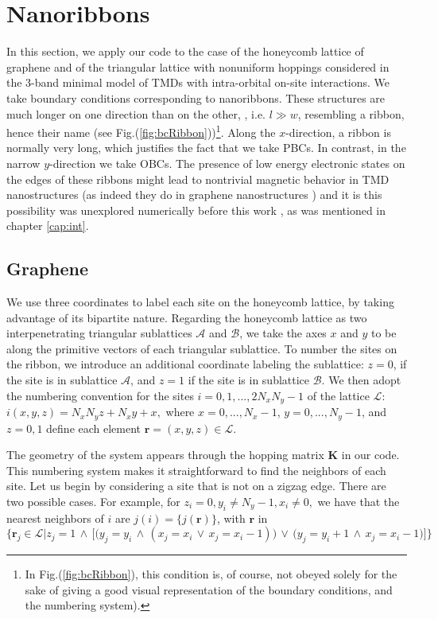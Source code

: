 \section{Nanoribbons}
\label{sec:nanoribbon}

In this section, we apply our code to the case of the honeycomb lattice of graphene and of the triangular lattice with nonuniform hoppings considered in the 3-band minimal model of \acs{TMD}s with intra-orbital on-site interactions.
We take boundary conditions corresponding to nanoribbons.
These structures are much longer on one direction than on the other, , i.e. $l \gg w$, resembling a ribbon, hence their name (see Fig.(\ref{fig:bcRibbon}))\footnote{In Fig.(\ref{fig:bcRibbon}), this condition is, of course, not obeyed solely for the sake of giving a good visual representation of the boundary conditions, and the numbering system).}.
Along the $x$-direction, a ribbon is normally very long, which justifies the fact that we take \acp{PBC}.
In contrast, in the narrow $y$-direction we take \acp{OBC}.
The presence of low energy electronic states on the edges of these ribbons might lead to nontrivial magnetic behavior in \ac{TMD} nanostructures (as indeed they do in graphene nanostructures \cite{yazyev_emergence_2010}) and it is this possibility was unexplored numerically before this work \cite{feldner_dynamical_2011, golor_quantum_2013}, as was mentioned in chapter \ref{cap:int}.

\subsection{Graphene}
\label{sec:graphene}

We use three coordinates to label each site on the honeycomb lattice, by taking advantage of its bipartite nature.
Regarding the honeycomb lattice as two interpenetrating triangular sublattices $\mathcal{A}$ and $\mathcal{B}$, we take the axes $x$ and $y$ to be along the primitive vectors of each triangular sublattice.
To number the sites on the ribbon, we introduce an additional coordinate labeling the sublattice: $z = 0$, if the site is in sublattice $\mathcal{A}$, and $z = 1$ if the site is in sublattice $\mathcal{B}$.
We then adopt the numbering convention for the sites $i = 0,1, ..., 2 N_x N_y - 1$ of the lattice $\mathcal{L}$:
$
i (x, y, z) = N_x N_y z + N_x y + x,
$
 where $x = 0, ..., N_x - 1$, $y = 0, ..., N_y - 1$, and $z = 0, 1$ define each element $\bm r = (x, y, z) \in \mathcal{L}$.

The geometry of the system appears through the hopping matrix $\bm K$ in our code.
This numbering system makes it straightforward to find the neighbors of each site.
Let us begin by considering a site that is not on a zigzag edge.
There are two possible cases. For example, for 
$
z_i = 0, y_i \neq N_y - 1, x_i \neq 0 ,
$
 we have that the nearest neighbors of $i$ are $ j (i) = \{ j ( \bm r) \}$, with $\bm r$ in
\begin{equation*}
\bigg\{ \bm r_j \in \mathcal{L} \bigg| z_j = 1 \,\land\, \bigg[ \bigg( y_j = y_i  \,\land\, ( x_j = x_i \,\lor\, x_j = x_i - 1) \bigg) \,\lor\, \bigg( y_j = y_i + 1  \,\land\, x_j = x_i - 1  \bigg)  \bigg] \bigg\}
\end{equation*}

